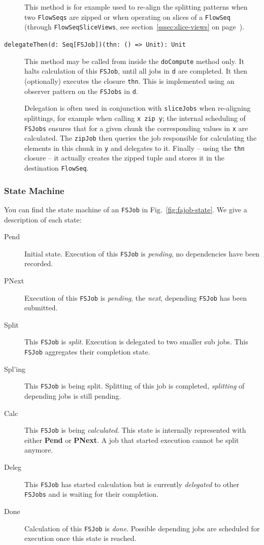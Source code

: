 \documentclass[runningheads,a4paper,fleqn]{llncs}
\begin{document}
\begin{description}
    This method is for example used to re-align the splitting
    patterns when two \texttt{FlowSeqs} are zipped or when
    operating on slices of a \texttt{FlowSeq} (through
    \texttt{FlowSeqSliceViews}, see section~\ref{sssec:slice-views}
    on page~\pageref{sssec:slice-views}).
  \item[\texttt{delegateThen(d: Seq[FSJob])(thn: () => Unit): Unit}]
    This method may be called from inside the \texttt{doCompute}
    method only. It halts calculation of this \texttt{FSJob}, until
    all jobs in \texttt{d} are completed. It then (optionally)
    executes the closure \texttt{thn}. This is implemented using an
    observer pattern on the \texttt{FSJobs} in \texttt{d}.

    Delegation is often used in conjunction with \texttt{sliceJobs}
    when re-aligning splittings, for example when calling \texttt{x
      zip y}; the internal scheduling of \texttt{FSJobs} ensures 
    that for a given chunk the corresponding values in \texttt{x} are
    calculated. The \texttt{zipJob} then queries the job responsible
    for calculating the elements in this chunk in \texttt{y} and
    delegates to it. Finally -- using the \texttt{thn} closure -- it
    actually creates the zipped tuple and stores it in the destination 
    \texttt{FlowSeq}.
\end{description}

\subsubsection{State Machine}
You can find the state machine of an \texttt{FSJob} in
Fig.~\ref{fig:fajob-state}. We give a description of each state: 

\begin{description}
\item[Pend] Initial state. Execution of this \texttt{FSJob} is
  \emph{pending}, no dependencies have been recorded.
\item[PNext] Execution of this \texttt{FSJob} is
  \emph{pending}, the \emph{next}, depending \texttt{FSJob} has been
  submitted.
\item[Split] This \texttt{FSJob} is \emph{split}. Execution is
  delegated to two smaller sub jobs. This \texttt{FSJob} aggregates
  their completion state.
\item[Spl'ing] This \texttt{FSJob} is being split. Splitting of this
  job is completed, \emph{splitting} of depending jobs is still
  pending.
\item[Calc] This \texttt{FSJob} is being \emph{calculated}. This state
  is internally represented with either \textbf{Pend} or
  \textbf{PNext}. A job that started execution cannot be split
  anymore.
\item[Deleg] This \texttt{FSJob} has started calculation but is
  currently \emph{delegated} to other \texttt{FSJobs} and is waiting
  for their completion.
\item[Done] Calculation of this \texttt{FSJob} is
  \emph{done}. Possible depending jobs are scheduled for execution
  once this state is reached.
\end{description}
\end{document}
